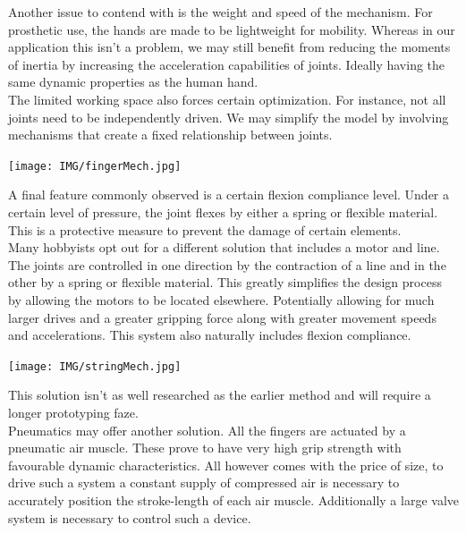 \documentclass{article}
\begin{document}
Another issue to contend with is the weight and speed of the mechanism. For prosthetic use, the hands are made to be lightweight for mobility. Whereas in our application this isn't a problem, we may still benefit from reducing the moments of inertia by increasing the acceleration capabilities of joints. Ideally having the same dynamic properties as the human hand.\\[12pt]
\indent The limited working space also forces certain optimization. For instance, not all joints need to be independently driven. We may simplify the model by involving mechanisms that create a fixed relationship between joints.

\begin{center}
\texttt{[image: IMG/fingerMech.jpg]}
\end{center}

A final feature commonly observed is a certain flexion compliance level. Under a certain level of pressure, the joint flexes by either a spring or flexible material. This is a protective measure to prevent the damage of certain elements.\\[12pt]
\indent Many hobbyists opt out for a different solution that includes a motor and line. The joints are controlled in one direction by the contraction of a line and in the other by a spring or flexible material. This greatly simplifies the design process by allowing the motors to be located elsewhere. Potentially allowing for much larger drives and a greater gripping force along with greater movement speeds and accelerations. This system also naturally includes flexion compliance.

\begin{center}
\texttt{[image: IMG/stringMech.jpg]}
\end{center}

This solution isn't as well researched as the earlier method and will require a longer prototyping faze. \\[12pt]
\indent Pneumatics may offer another solution. All the fingers are actuated by a pneumatic air muscle. These prove to have very high grip strength with favourable dynamic characteristics. All however comes with the price of size, to drive such a system a constant supply of compressed air is necessary to accurately position the stroke-length of each air muscle. Additionally a large valve system is necessary to control such a device.
\end{document}
